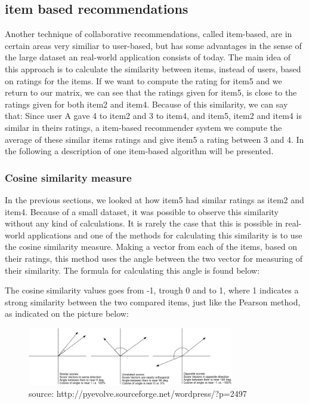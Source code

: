 
\subsection{item based recommendations} %
\label{sub:item_based_recommendations}
Another technique of collaborative recommendations, called item-based, are in certain areas very similiar to user-based, but has some advantages in the sense of the large dataset an real-world application consists of today. The main idea of this approach is to calculate the similarity between items, instead of users, based on ratings for the items. If we want to compute the rating for item5 and we return to our matrix, we can see that the ratings given for item5, is close to the ratings given for both item2 and item4. Because of this similarity, we can say that: Since user A gave 4 to item2 and 3 to item4, and item5, item2 and item4 is similar in theirs ratings, a item-based recommender system we compute the average of these similar items ratings and give item5 a rating between 3 and 4. 
In the following a description of one item-based algorithm will be presented. 

\subsubsection{Cosine similarity measure}
In the previous sections, we looked at how item5 had similar ratings as item2 and item4. Because of a small dataset, it was possible to observe this similarity without any kind of calculations. It is rarely the case that this is possible in real-world applications and one of the methods for calculating this similarity is to use the cosine similarity measure. Making a vector from each of the items, based on their ratings, this method uses the angle between the two vector for measuring of their similarity. The formula for calculating this angle is found below:


The cosine similarity values goes from -1, trough 0 and to 1, where 1 indicates a strong similarity between the two compared items, just like the Pearson method, as indicated on the picture below:

\begin{figure}[ht!]
\centering
\includegraphics[width=90mm]{Pictures/cosinesimilarity.png}
\caption{source: http://pyevolve.sourceforge.net/wordpress/?p=2497}
\label{cosinesimilarity}
\end{figure}

